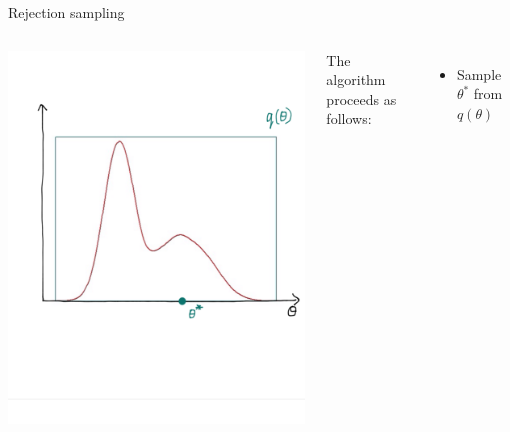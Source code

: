 \documentclass[compress]{beamer}
\begin{document}
\begin{frame}[label=sec-5-4]{Rejection sampling}
\begin{columns}[c] 
\includegraphics[width=.8\linewidth]{RS3.png}

The algorithm proceeds as follows:\\
\begin{itemize}
\item Sample $\theta^*$ from $q(\theta)$
\end{itemize}
\end{columns}
\end{frame}
\end{document}
